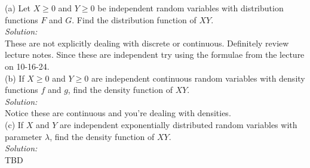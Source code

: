 \documentclass[10pt]{amsart}
\begin{document}
  (a) Let $X \geq 0$ and $Y \geq 0$  be independent random variables with distribution functions $F$ and $G$. Find the distribution function of $XY$. \\
\textit{Solution:} \\
These are not explicitly dealing with discrete or continuous.
Definitely review lecture notes.
Since these are independent try using the formulae from the lecture on 10-16-24.
\\

(b) If $X \geq 0$ and $Y \geq 0$ are independent continuous random variables with density functions $f$ and $g$, find the density function of $XY$. \\
\textit{Solution:} \\
Notice these are continuous and you're dealing with densities.
\\

(c) If $X$ and $Y$ are independent exponentially distributed random variables with parameter $\lambda$, find the density function of $XY$.\\
\textit{Solution:} \\
TBD
\\
\end{document}
